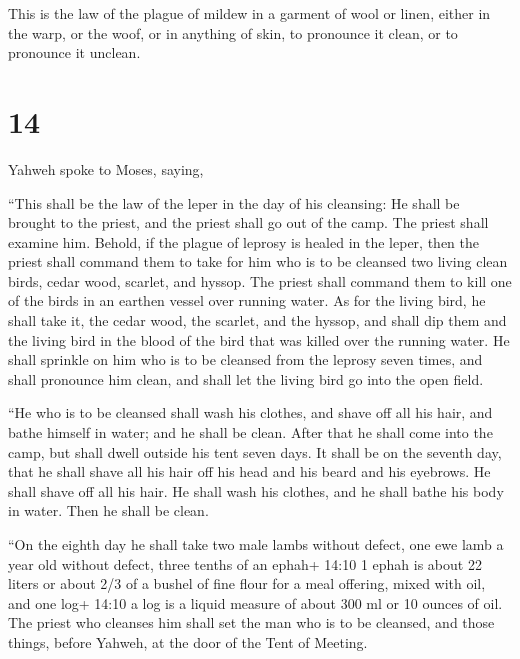  This is the law of the plague of mildew in a garment of
wool or linen, either in the warp, or the woof, or in anything of skin,
to pronounce it clean, or to pronounce it unclean.

\hypertarget{section-13}{%
\section{14}\label{section-13}}

 Yahweh spoke to Moses, saying,

 ``This shall be the law of the leper in the day of his
cleansing: He shall be brought to the priest,  and the
priest shall go out of the camp. The priest shall examine him. Behold,
if the plague of leprosy is healed in the leper,  then the
priest shall command them to take for him who is to be cleansed two
living clean birds, cedar wood, scarlet, and hyssop.  The
priest shall command them to kill one of the birds in an earthen vessel
over running water.  As for the living bird, he shall take
it, the cedar wood, the scarlet, and the hyssop, and shall dip them and
the living bird in the blood of the bird that was killed over the
running water.  He shall sprinkle on him who is to be
cleansed from the leprosy seven times, and shall pronounce him clean,
and shall let the living bird go into the open field.

 ``He who is to be cleansed shall wash his clothes, and
shave off all his hair, and bathe himself in water; and he shall be
clean. After that he shall come into the camp, but shall dwell outside
his tent seven days.  It shall be on the seventh day, that
he shall shave all his hair off his head and his beard and his eyebrows.
He shall shave off all his hair. He shall wash his clothes, and he shall
bathe his body in water. Then he shall be clean.

 ``On the eighth day he shall take two male lambs without
defect, one ewe lamb a year old without defect, three tenths of an
ephah+ 14:10 1 ephah is about 22 liters or about 2/3 of a bushel of fine
flour for a meal offering, mixed with oil, and one log+ 14:10 a log is a
liquid measure of about 300 ml or 10 ounces of oil.  The
priest who cleanses him shall set the man who is to be cleansed, and
those things, before Yahweh, at the door of the Tent of Meeting.

